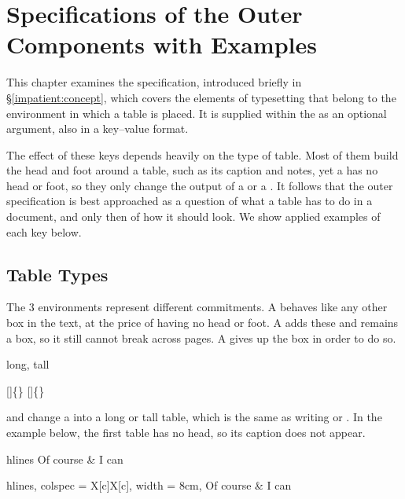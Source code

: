 \chapter{Specifications of the Outer Components with Examples}
This chapter examines the  specification, introduced briefly in \S\ref{impatient:concept}, which covers the elements of typesetting that belong to the environment in which a table is placed. It is supplied within the  as an optional argument, also in a key--value format.

The effect of these keys depends heavily on the type of table. Most of them build the head and foot around a table, such as its caption and notes, yet a  has no head or foot, so they only change the output of a  or a . It follows that the outer specification is best approached as a question of what a table has to do in a document, and only then of how it should look. We show applied examples of each key below.

\section{Table Types}\label{outer:types}
The 3 environments represent different commitments. A  behaves like any other box in the text, at the price of having no head or foot. A  adds these and remains a box, so it still cannot break across pages. A  gives up the box in order to do so.

\begin{codedescribe}[
    key,
    new=2021J,
    update=2021M
]{long, tall}
\begin{codesyntax}
[]\{\}
[]\{\}
\end{codesyntax}
 and  change a  into a long or tall table, which is the same as writing  or . In the example below, the first table has no head, so its caption does not appear.

\begin{codestore}[st=outer:tall]
    \begin{tblr}[caption = {Can you pass the salt?}]{hlines}
        Of course & I can
    \end{tblr}\quad
    \begin{tblr}[
        tall, caption = {Can you pass the salt?},
        ]{
        hlines, colspec = {X[c]X[c]}, width = 8cm,
        }
        Of course & I can
    \end{tblr}\end{codestore}
\begin{center}
\end{center}
\end{codedescribe}

